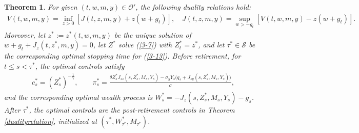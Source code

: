 \documentclass[a4paper,11pt]{amsart}
\numberwithin{equation}{section}
\newtheorem{theorem}{Theorem}[section]
\newtheorem{lemma}{Lemma}[section]
\newcommand{\blue}[1]{{\color{black}#1}}
\begin{document}
{%
	











\begin{theorem}\label{verification}
For given $(t,w,m,y)\in \mathcal O' $, the following duality relations hold:
\begin{align*}
	V(t,w,m,y)=\inf_{z>0}[J(t,z,m,y)+z(w+g_t)], \quad J(t,z,m,y)= \sup_{w>-g_t}[V(t,w,m,y)-z(w+g_t)]. 
\end{align*}
Moreover, let $z^\ast:=z^\ast(t,w,m,y)$ be the unique solution of $w+g_t+J_z(t,z^\ast,m,y)=0$, let $Z^\ast$ solve (\ref{3-7}) with $Z_t^\ast=z^\ast$, and let $\tau^\ast\in\mathcal S$ be the corresponding optimal stopping time for (\ref{3-13}). Before retirement, for $t\leq s<\tau^\ast$, the optimal controls satisfy
\begin{align*}
c_s^\ast=(Z_s^\ast)^{-\frac{1}{\gamma}},\qquad
\pi_s^\ast=\frac{\theta Z_s^\ast J_{zz}(s,Z_s^\ast,M_s,Y_s)-\sigma_yY_s\big(q_s+J_{zy}(s,Z_s^\ast,M_s,Y_s)\big)}{\sigma},
\end{align*}
and the corresponding optimal wealth process is $W_s^\ast=-J_z(s,Z_s^\ast,M_s,Y_s)-g_s$. 
\blue{After $\tau^\ast$, the optimal controls are the post-retirement controls in Theorem \ref{dualityrelation}, initialized at $(\tau^\ast,W_{\tau^\ast}^\ast,M_{\tau^\ast})$.}





\end{theorem}}
\end{document}
